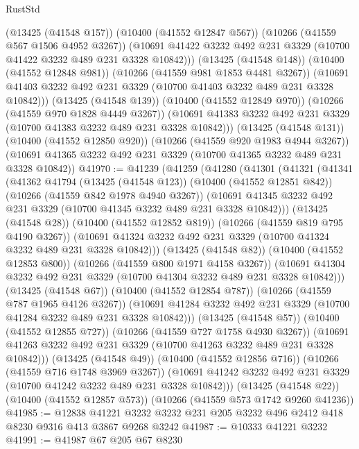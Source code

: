 \begin{lexlean}{RustStd}
\begin{coremodule}
          (@13425 (@41548 @157))
          (@10400 (@41552 @12847 @567))
          (@10266 (@41559 @567 @1506 @4952 @3267))
          (@10691 @41422 @3232 @492 @231 @3329 (@10700 @41422 @3232 @489 @231 @3328 @10842)))
        (@13425 (@41548 @148))
        (@10400 (@41552 @12848 @981))
        (@10266 (@41559 @981 @1853 @4481 @3267))
        (@10691 @41403 @3232 @492 @231 @3329 (@10700 @41403 @3232 @489 @231 @3328 @10842)))
      (@13425 (@41548 @139))
      (@10400 (@41552 @12849 @970))
      (@10266 (@41559 @970 @1828 @4449 @3267))
      (@10691 @41383 @3232 @492 @231 @3329 (@10700 @41383 @3232 @489 @231 @3328 @10842)))
    (@13425 (@41548 @131))
    (@10400 (@41552 @12850 @920))
    (@10266 (@41559 @920 @1983 @4944 @3267))
    (@10691 @41365 @3232 @492 @231 @3329 (@10700 @41365 @3232 @489 @231 @3328 @10842))
@41970 := @41239
    (@41259
      (@41280
        (@41301
          (@41321
            (@41341
              (@41362
                @41794
                (@13425 (@41548 @123))
                (@10400 (@41552 @12851 @842))
                (@10266 (@41559 @842 @1978 @4940 @3267))
                (@10691 @41345 @3232 @492 @231 @3329 (@10700 @41345 @3232 @489 @231 @3328 @10842)))
              (@13425 (@41548 @28))
              (@10400 (@41552 @12852 @819))
              (@10266 (@41559 @819 @795 @4190 @3267))
              (@10691 @41324 @3232 @492 @231 @3329 (@10700 @41324 @3232 @489 @231 @3328 @10842)))
            (@13425 (@41548 @82))
            (@10400 (@41552 @12853 @800))
            (@10266 (@41559 @800 @1971 @4158 @3267))
            (@10691 @41304 @3232 @492 @231 @3329 (@10700 @41304 @3232 @489 @231 @3328 @10842)))
          (@13425 (@41548 @67))
          (@10400 (@41552 @12854 @787))
          (@10266 (@41559 @787 @1965 @4126 @3267))
          (@10691 @41284 @3232 @492 @231 @3329 (@10700 @41284 @3232 @489 @231 @3328 @10842)))
        (@13425 (@41548 @57))
        (@10400 (@41552 @12855 @727))
        (@10266 (@41559 @727 @1758 @4930 @3267))
        (@10691 @41263 @3232 @492 @231 @3329 (@10700 @41263 @3232 @489 @231 @3328 @10842)))
      (@13425 (@41548 @49))
      (@10400 (@41552 @12856 @716))
      (@10266 (@41559 @716 @1748 @3969 @3267))
      (@10691 @41242 @3232 @492 @231 @3329 (@10700 @41242 @3232 @489 @231 @3328 @10842)))
    (@13425 (@41548 @22))
    (@10400 (@41552 @12857 @573))
    (@10266 (@41559 @573 @1742 @9260 @41236))
@41985 := @12838
    @41221
    @3232
    @3232
    @231
    @205
    @3232
    @496
    @2412
    @418
    @8230
    @9316
    @413
    @3867
    @9268
    @3242
@41987 := @10333 @41221 @3232
@41991 := @41987 @67 @205 @67 @8230

\end{coremodule}
\end{lexlean}
